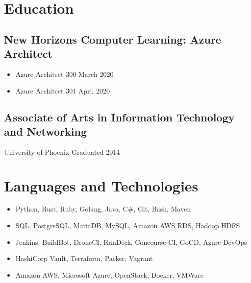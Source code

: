 \documentclass{article}
\begin{document}
  \section{Education}
    \subsection{New Horizons Computer Learning: Azure Architect}

      \begin{scriptsize}
      \begin{itemize}

          \item Azure Architect 300 \hfill March 2020

          \item Azure Architect 301 \hfill April 2020

      \end{itemize}
      \end{scriptsize}

    \subsection{Associate of Arts in Information Technology and Networking}
      \begin{scriptsize}
      University of Phoenix
      \hfill
      Graduated 2014
      \end{scriptsize}

  \section{Languages and Technologies}

    \begin{scriptsize}
    \begin{itemize}

      \item Python, Rust, Ruby, Golang, Java, C\#, Git, Bash, Maven

      \item SQL, PostgreSQL, MariaDB, MySQL, Amazon AWS RDS, Hadoop HDFS

      \item Jenkins, BuildBot, DroneCI, RunDeck, Concourse-CI, GoCD, Azure
        DevOps

      \item HashiCorp Vault, Terraform, Packer, Vagrant

      \item Amazon AWS, Microsoft Azure, OpenStack, Docker, VMWare

    \end{itemize}
    \end{scriptsize}
\end{document}
